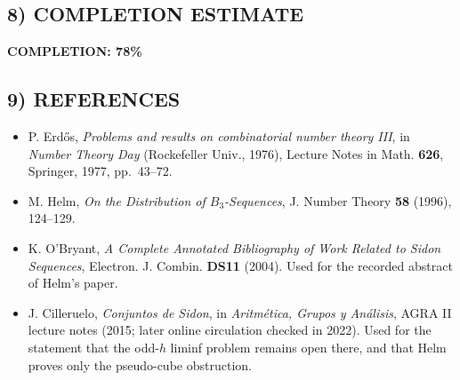 \subsection{8) COMPLETION ESTIMATE}
\textbf{COMPLETION: 78\%}

\subsection{9) REFERENCES}
\begin{itemize}
  \item P. Erd\H{o}s, \emph{Problems and results on combinatorial number theory III}, in \emph{Number Theory Day} (Rockefeller Univ., 1976), Lecture Notes in Math. \textbf{626}, Springer, 1977, pp.~43--72.
  \item M. Helm, \emph{On the Distribution of $B_3$-Sequences}, J. Number Theory \textbf{58} (1996), 124--129.
  \item K. O'Bryant, \emph{A Complete Annotated Bibliography of Work Related to Sidon Sequences}, Electron. J. Combin. \textbf{DS11} (2004). Used for the recorded abstract of Helm's paper.
  \item J. Cilleruelo, \emph{Conjuntos de Sidon}, in \emph{Aritmética, Grupos y Análisis}, AGRA II lecture notes (2015; later online circulation checked in 2022). Used for the statement that the odd-$h$ liminf problem remains open there, and that Helm proves only the pseudo-cube obstruction.
\end{itemize}
